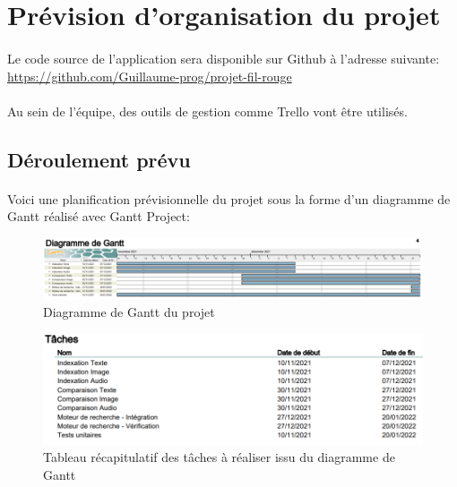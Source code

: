\documentclass[../main.tex]{subfiles}
\begin{document}
    \section{Prévision d'organisation du projet}


    \paragraph{}
    Le code source de l’application sera disponible sur Github à l’adresse suivante: \url{https://github.com/Guillaume-prog/projet-fil-rouge}

    \paragraph{}
    Au sein de l’équipe, des outils de gestion comme Trello vont être utilisés.

    \subsection{Déroulement prévu}

    \paragraph{}
    Voici une planification prévisionnelle du projet sous la forme d’un diagramme de Gantt réalisé avec Gantt Project:

    \begin{figure}[H]
        \centering
        \includegraphics[width=160mm]{gantt/gantt_calendar.png}
        \caption{Diagramme de Gantt du projet}
    \end{figure}

    \begin{figure}[H]
        \centering
        \includegraphics[width=160mm]{gantt/gantt_list.png}
        \caption{Tableau récapitulatif des tâches à réaliser issu du diagramme de Gantt}
    \end{figure}
\end{document}
